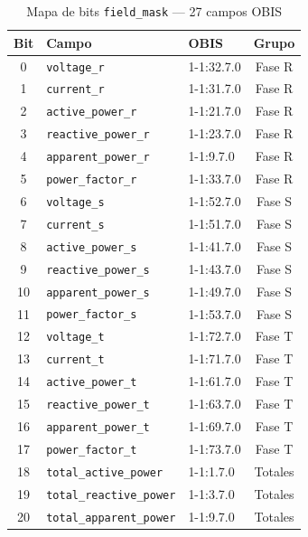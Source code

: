 
\begin{table}[htbp]
\centering
\caption{Mapa de bits \texttt{field\_mask} — 27 campos OBIS}
\label{tab:field-mask-v017}
\small
\begin{tabular}{c l l c}
\toprule
\textbf{Bit} & \textbf{Campo} & \textbf{OBIS} & \textbf{Grupo} \\
\midrule
0  & \texttt{voltage\_r}          & 1-1:32.7.0  & Fase R \\
1  & \texttt{current\_r}          & 1-1:31.7.0  & Fase R \\
2  & \texttt{active\_power\_r}    & 1-1:21.7.0  & Fase R \\
3  & \texttt{reactive\_power\_r}  & 1-1:23.7.0  & Fase R \\
4  & \texttt{apparent\_power\_r}  & 1-1:9.7.0   & Fase R \\
5  & \texttt{power\_factor\_r}    & 1-1:33.7.0  & Fase R \\
\midrule
6  & \texttt{voltage\_s}          & 1-1:52.7.0  & Fase S \\
7  & \texttt{current\_s}          & 1-1:51.7.0  & Fase S \\
8  & \texttt{active\_power\_s}    & 1-1:41.7.0  & Fase S \\
9  & \texttt{reactive\_power\_s}  & 1-1:43.7.0  & Fase S \\
10 & \texttt{apparent\_power\_s}  & 1-1:49.7.0  & Fase S \\
11 & \texttt{power\_factor\_s}    & 1-1:53.7.0  & Fase S \\
\midrule
12 & \texttt{voltage\_t}          & 1-1:72.7.0  & Fase T \\
13 & \texttt{current\_t}          & 1-1:71.7.0  & Fase T \\
14 & \texttt{active\_power\_t}    & 1-1:61.7.0  & Fase T \\
15 & \texttt{reactive\_power\_t}  & 1-1:63.7.0  & Fase T \\
16 & \texttt{apparent\_power\_t}  & 1-1:69.7.0  & Fase T \\
17 & \texttt{power\_factor\_t}    & 1-1:73.7.0  & Fase T \\
\midrule
18 & \texttt{total\_active\_power}   & 1-1:1.7.0   & Totales \\
19 & \texttt{total\_reactive\_power} & 1-1:3.7.0   & Totales \\
20 & \texttt{total\_apparent\_power} & 1-1:9.7.0   & Totales \\

\end{tabular}
\end{table}
